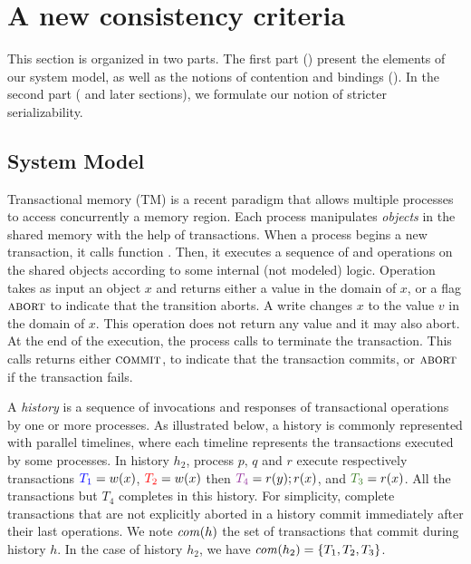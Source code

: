 \section{A new consistency criteria}

This section is organized in two parts.
The first part () present the elements of our system model, as well as the notions of contention and bindings ().
In the second part ( and later sections), we formulate our notion of stricter serializability.

\subsection{System Model}

Transactional memory (TM) is a recent paradigm that allows multiple processes to access concurrently a memory region.
Each process manipulates \emph{objects} in the shared memory with the help of transactions.
When a process begins a new transaction, it calls function \stmBeginFunction.
Then, it executes a sequence of \stmReadFunction and \stmWriteFunction operations on the shared objects according to some internal (not modeled) logic.
Operation  takes as input an object $x$ and returns either a value in the domain of $x$, or a flag $\text{\textsc{abort}}$ to indicate that the transition aborts.
A write  changes $x$ to the value $v$ in the domain of $x$.
This operation does not return any value and it may also abort.
At the end of the execution, the process calls \stmTryCommitFunction to terminate the transaction.
This calls returns either $\text{\textsc{commit}}$, to indicate that the transaction commits, or $\text{\textsc{abort}}$ if the transaction fails.

A \emph{history} is a sequence of invocations and responses of transactional operations by one or more processes.
As illustrated below, a history is commonly represented with parallel timelines, where each timeline represents the transactions executed by some processes.
In history $h_2$, process $p$, $q$ and $r$ execute respectively transactions ${\color{blue}{T_1}}=w(x)$, ${\color{red}{T_2}}=w(x)$ then ${\color{Purple}{T_4}}=r(y);r(x)$, and ${\color{OliveGreen}{T_3}}=r(x)$.
All the transactions but $T_4$ completes in this history.
For simplicity, complete transactions that are not explicitly aborted in a history commit immediately after their last operations.
We note $\committed{h}$ the set of transactions that commit during history $h$.
In the case of history $h_2$, we have $\committed{h_2}=\{T_1,T_2,T_3\}$.

